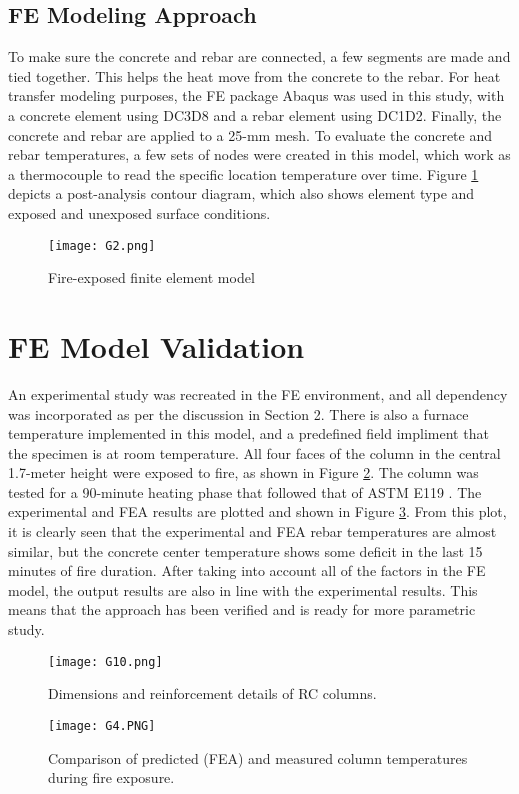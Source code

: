 \documentclass[12pt, letterpaper, oneside]{report}
\begin{document}
\subsection{FE Modeling Approach}
To make sure the concrete and rebar are connected, a few segments are made and tied together. This helps the heat move from the concrete to the rebar. For heat transfer modeling purposes, the FE package Abaqus was used in this study, with a concrete element using DC3D8 and a rebar element using DC1D2. Finally, the concrete and rebar are applied to a 25-mm mesh. To evaluate the concrete and rebar temperatures, a few sets of nodes were created in this model, which work as a thermocouple to read the specific location temperature over time. Figure \ref{fig:3} depicts a post-analysis contour diagram, which also shows element type and exposed and unexposed surface conditions.
\begin{figure}
    \centering
    \texttt{[image: G2.png]}
    \caption{Fire-exposed finite element model}
    \label{fig:3}
\end{figure}

\section{FE Model Validation}
An experimental study \cite{R11} was recreated in the FE environment, and all dependency was incorporated as per the discussion in Section 2. There is also a furnace temperature implemented in this model, and a predefined field impliment that the specimen is at room temperature. All four faces of the column in the central 1.7-meter height were exposed to fire, as shown in Figure \ref{fig:4}. The column was tested for a 90-minute heating phase that followed that of ASTM E119 \cite{R9}. The experimental and FEA results are plotted and shown in Figure \ref{fig:5}. From this plot, it is clearly seen that the experimental and FEA rebar temperatures are almost similar, but the concrete center temperature shows some deficit in the last 15 minutes of fire duration. After taking into account all of the factors in the FE model, the output results are also in line with the experimental results. This means that the approach has been verified and is ready for more parametric study.
\begin{figure}
    \centering
    \texttt{[image: G10.png]}
    \caption{Dimensions and reinforcement details of RC columns.}
    \label{fig:4}
\end{figure}
\begin{figure}
    \centering
    \texttt{[image: G4.PNG]}
    \caption{Comparison of predicted (FEA) and measured column temperatures during fire exposure. \cite{R11}}
    \label{fig:5}
\end{figure}
\end{document}
